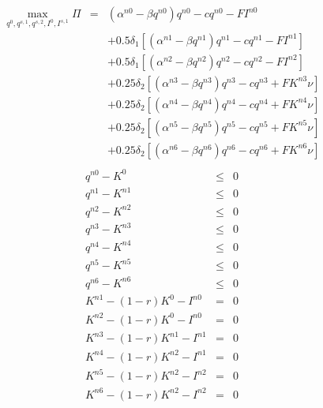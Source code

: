 \documentclass[11pt,a4paper]{article}
\begin{document}
\begin{eqnarray*}
	\max_{q^0,q^{s,1},q^{s,2},I^0,I^{s,1}}\Pi &=& (\alpha^{n0}-\beta q^{n0})q^{n0} - cq^{n0} -FI^{n0}  \\
        && + 0.5\delta_1\left[(\alpha^{n1}-\beta q^{n1})q^{n1} - cq^{n1} - FI^{n1}\right] \\
        && + 0.5\delta_1\left[(\alpha^{n2}-\beta q^{n2})q^{n2} - cq^{n2} - FI^{n2}\right] \\
        && + 0.25\delta_2\left[(\alpha^{n3}-\beta q^{n3})q^{n3} - cq^{n3} + FK^{n3}\nu\right] \\
        && + 0.25\delta_2\left[(\alpha^{n4}-\beta q^{n4})q^{n4} - cq^{n4} + FK^{n4}\nu\right] \\
        && + 0.25\delta_2\left[(\alpha^{n5}-\beta q^{n5})q^{n5} - cq^{n5} + FK^{n5}\nu\right] \\
        && + 0.25\delta_2\left[(\alpha^{n6}-\beta q^{n6})q^{n6} - cq^{n6} + FK^{n6}\nu\right] \\
\end{eqnarray*}
\begin{eqnarray*}
	q^{n0} - K^0 &\leq& 0\\
	q^{n1} - K^{n1} &\leq& 0\\
        q^{n2} - K^{n2} &\leq& 0\\
        q^{n3} - K^{n3} &\leq& 0\\
        q^{n4} - K^{n4} &\leq& 0\\
	q^{n5} - K^{n5} &\leq& 0\\
	q^{n6} - K^{n6} &\leq& 0\\
        K^{n1} - (1-r)K^0 - I^{n0} &=& 0\\
        K^{n2} - (1-r)K^0 - I^{n0} &=& 0\\
        K^{n3} - (1-r)K^{n1} - I^{n1} &=& 0\\
        K^{n4} - (1-r)K^{n2} - I^{n1} &=& 0\\
        K^{n5} - (1-r)K^{n2} - I^{n2} &=& 0\\
        K^{n6} - (1-r)K^{n2} - I^{n2} &=& 0\\
\end{eqnarray*}
\end{document}

